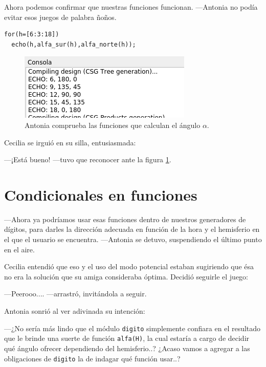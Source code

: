\guillemotright Ahora podemos confirmar que nuestras funciones
funcionan.  ---Antonia no podía evitar esos juegos de palabra ñoños.

    \begin{lstlisting}
for(h=[6:3:18])
  echo(h,alfa_sur(h),alfa_norte(h));
\end{lstlisting}

\begin{figure}[ht]
  \centering
  \includegraphics[width=.6\textwidth]{imagenes/consola-echo-funciones}
       \caption[Comprobación de funciones con
       \lstinline!echo!]{Antonia comprueba las funciones que calculan
         el ángulo $\alpha$.}
  \label{fig:consola-echo-funciones}
\end{figure}
  


Cecilia se irguió en su silla, entusiasmada:

---¡Está bueno!  ---tuvo que reconocer ante la figura
\ref{fig:consola-echo-funciones}.

\section{Condicionales en funciones}

---Ahora ya podríamos usar esas funciones dentro de nuestros
generadores de dígitos, para darles la dirección adecuada en función
de la hora y el hemisferio en el que el usuario se encuentra.
---An\-to\-nia se detuvo, suspendiendo el último punto en el aire.

Cecilia entendió que eso y el uso del modo potencial estaban
sugiriendo que ésa no era la solución que su amiga consideraba
óptima. Decidió seguirle el juego:

---Peerooo.... ---arrastró, invitándola a seguir.

Antonia sonrió al ver adivinada su intención:

---¿No sería más lindo que el módulo \lstinline!digito! simplemente
confiara en el resultado que le brinde una suerte de función
\lstinline!alfa(H)!, la cual estaría a cargo de decidir qué ángulo
ofrecer dependiendo del hemisferio..? ¿Acaso vamos a agregar a las
obligaciones de \lstinline!digito! la de indagar qué función usar..?

